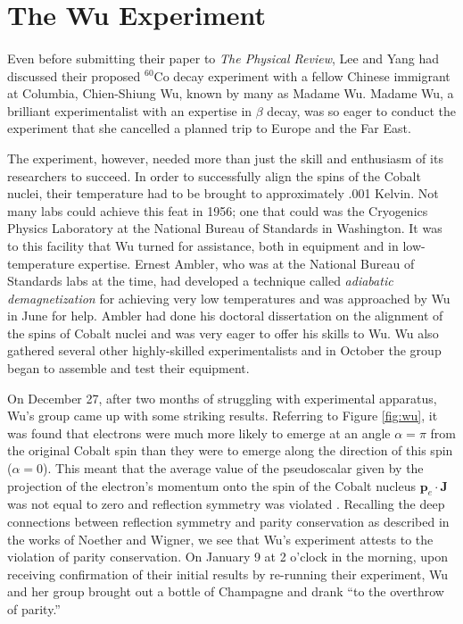 \documentclass[12pt]{book}
\begin{document}
\section{The Wu Experiment}

\paragraph*{}Even before submitting their paper to \emph{The Physical Review}, Lee and Yang had discussed their proposed $^{60}$Co decay experiment with a fellow Chinese immigrant at Columbia, Chien-Shiung Wu, known by many as Madame Wu. Madame Wu, a brilliant experimentalist with an expertise in $\beta$ decay, was so eager to conduct the experiment that she cancelled a planned trip to Europe and the Far East. 

The experiment, however, needed more than just the skill and enthusiasm of its researchers to succeed. In order to successfully align the spins of the Cobalt nuclei, their temperature had to be brought to approximately .001 Kelvin. Not many labs could achieve this feat in 1956; one that could was the Cryogenics Physics Laboratory at the National Bureau of Standards in Washington. It was to this facility that Wu turned for assistance, both in equipment and in low-temperature expertise. Ernest Ambler, who was at the National Bureau of Standards labs at the time, had developed a technique called \emph{adiabatic demagnetization} for achieving very low temperatures and was approached by Wu in June for help. Ambler had done his doctoral dissertation on the alignment of the spins of Cobalt nuclei and was very eager to offer his skills to Wu. Wu also gathered several other highly-skilled experimentalists and in October the group began to assemble and test their equipment.

On December 27, after two months of struggling with experimental apparatus, Wu's group came up with some striking results. Referring to Figure \ref{fig:wu}, it was found that electrons were much more likely to emerge at an angle $\alpha=\pi$ from the original Cobalt spin than they were to emerge along the direction of this spin ($\alpha=0$). This meant that the average value of the pseudoscalar given by the projection of the electron's momentum onto the spin of the Cobalt nucleus $\mathbf{p}_{e}\cdot \mathbf{J}$ was not equal to zero and reflection symmetry was violated \cite{wu}. Recalling the deep connections between reflection symmetry and parity conservation as described in the works of Noether and Wigner, we see that Wu's experiment attests to the violation of parity conservation. On January 9 at 2 o'clock in the morning, upon receiving confirmation of their initial results by re-running their experiment, Wu and her group brought out a bottle of Champagne and drank ``to the overthrow of parity.''\cite{forman}
\end{document}
